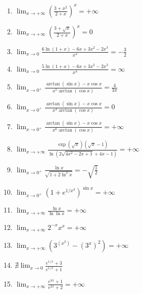 \documentclass[11pt,a4paper]{article}
\begin{document}
\begin{enumerate}
\item $\displaystyle \lim_{x \to +\infty} \left(\frac{3 + x^{2}}{2 + x}\right)^{x} = +\infty$
\item $\displaystyle \lim_{x \to +\infty} \left(\frac{3 + \sqrt{x}}{2 + x}\right)^{x} = 0$
\item $\displaystyle \lim_{x \to 0} \frac{6\ln(1 + x) - 6x + 3x^{2} - 2x^{3}}{x^{4}} = -\frac{3}{2}$
\item $\displaystyle \lim_{x \to 0} \frac{5\ln(1 + x) - 6x + 3x^{2} - 2x^{3}}{x^{4}} = \infty$
\item $\displaystyle \lim_{x \to 0^{+}} \frac{\arctan(\sin x) - x\cos x}{x^{5}\arctan(\cos x)} = \frac{4}{3\pi}$
\item $\displaystyle \lim_{x \to 0^{+}} \frac{\arctan(\sin x) - x\cos x}{x^{4}\arctan(\cos x)} = 0$
\item $\displaystyle \lim_{x \to 0^{+}} \frac{\arctan(\sin x) - x\cos x}{x^{6}\arctan(\cos x)} = +\infty$
\item $\displaystyle \lim_{x \to +\infty} \frac{\exp(\sqrt{x})(\sqrt{x} - 1)}{\ln\left(2\sqrt{4x^{2} - 2x + 1} + 4x - 1\right)} = +\infty$
\item $\displaystyle \lim_{x \to 0^{+}} \frac{\ln x}{\sqrt{1 + 2\ln^{2} x}} = -\sqrt{\frac{1}{2}}$
\item $\displaystyle \lim_{x \to 0^{+}} \left(1 + e^{1/x^{3}}\right)^{\sin x} = +\infty$
\item $\displaystyle \lim_{x \to +\infty} \frac{\ln x}{\ln\ln x} = +\infty$
\item $\displaystyle \lim_{x \to +\infty} 2^{-x}x^{x} = +\infty$
\item $\displaystyle \lim_{x \to +\infty} \left(3^{(x^{2})} - (3^{x})^{2}\right) = +\infty$
\item $\displaystyle \nexists \lim_{x \to 0} \frac{e^{1/x} + 3}{e^{1/x} + 1}$
\item $\displaystyle \lim_{x \to +\infty} \frac{e^{3x} + 1}{e^{2x} + 2} = +\infty$
\end{enumerate}
\end{document}
